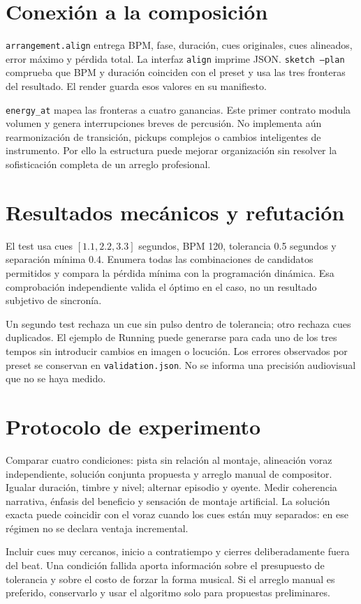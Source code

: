 \documentclass[11pt,a4paper]{article}
\begin{document}
\newpage
\section{Conexión a la composición}
\texttt{arrangement.align} entrega BPM, fase, duración, cues originales, cues alineados, error máximo y pérdida total. La interfaz \texttt{align} imprime JSON. \texttt{sketch --plan} comprueba que BPM y duración coinciden con el preset y usa las tres fronteras del resultado. El render guarda esos valores en su manifiesto.

\texttt{energy\_at} mapea las fronteras a cuatro ganancias. Este primer contrato modula volumen y genera interrupciones breves de percusión. No implementa aún rearmonización de transición, pickups complejos o cambios inteligentes de instrumento. Por ello la estructura puede mejorar organización sin resolver la sofisticación completa de un arreglo profesional.
\section{Resultados mecánicos y refutación}
El test usa cues $[1.1,2.2,3.3]$ segundos, BPM 120, tolerancia 0.5 segundos y separación mínima 0.4. Enumera todas las combinaciones de candidatos permitidos y compara la pérdida mínima con la programación dinámica. Esa comprobación independiente valida el óptimo en el caso, no un resultado subjetivo de sincronía.

Un segundo test rechaza un cue sin pulso dentro de tolerancia; otro rechaza cues duplicados. El ejemplo de Running puede generarse para cada uno de los tres tempos sin introducir cambios en imagen o locución. Los errores observados por preset se conservan en \texttt{validation.json}. No se informa una precisión audiovisual que no se haya medido.
\section{Protocolo de experimento}
Comparar cuatro condiciones: pista sin relación al montaje, alineación voraz independiente, solución conjunta propuesta y arreglo manual de compositor. Igualar duración, timbre y nivel; alternar episodio y oyente. Medir coherencia narrativa, énfasis del beneficio y sensación de montaje artificial. La solución exacta puede coincidir con el voraz cuando los cues están muy separados: en ese régimen no se declara ventaja incremental.

Incluir cues muy cercanos, inicio a contratiempo y cierres deliberadamente fuera del beat. Una condición fallida aporta información sobre el presupuesto de tolerancia y sobre el costo de forzar la forma musical. Si el arreglo manual es preferido, conservarlo y usar el algoritmo solo para propuestas preliminares.
\end{document}
